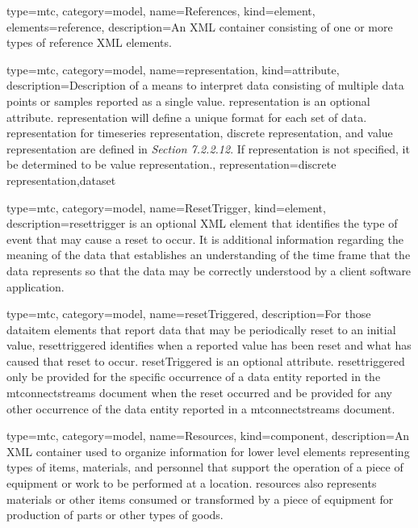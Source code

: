 {
  type=mtc,
  category=model,
  name={References},
  kind={element},
  elements={\gls{reference}},
  description={An XML container consisting of one or more types of \gls{reference} XML elements.}
}


{
  type=mtc,
  category=model,
  name={representation},
  kind={attribute},
  description={Description of a means to interpret data consisting of multiple data points or samples reported as a single value.  \newline \gls{representation} is an optional attribute.  \newline \gls{representation} will define a unique format for each set of data.  \newline \gls{representation} for \gls{timeseries representation}, \gls{discrete representation}, and \gls{value representation} are defined in  \textit{Section 7.2.2.12}.  \newline If \gls{representation} is not specified, it \MUST be determined to be \gls{value representation}.},
  representation={\gls{discrete representation},\gls{dataset}}
}

{
  type=mtc,
  category=model,
  name={ResetTrigger},
  kind={element},
  description={\gls{resettrigger} is an optional XML element that identifies the type of event that may cause a reset to occur. It is additional information regarding the meaning of the data that establishes an understanding of the time frame that the data represents so that the data may be correctly understood by a client software application.}
}


{
  type=mtc,
  category=model,
  name={resetTriggered},
  description={For those \gls{dataitem} elements that report data that may be periodically reset to an initial value, \gls{resettriggered} identifies when a reported value has been reset and what has caused that reset to occur.  \newline resetTriggered is an optional attribute.  \newline \gls{resettriggered} \MUST only be provided for the specific occurrence of a \gls{data entity} reported in the \gls{mtconnectstreams} document when the reset occurred and \MUSTNOT be provided for any other occurrence of the \gls{data entity} reported in a \gls{mtconnectstreams} document.}
}


{
  type=mtc,
  category=model,
  name={Resources},
  kind={component},
  description={An XML container used to organize information for \gls{lower level} elements representing types of items, materials, and personnel that support the operation of a piece of equipment or work to be performed at a location. \gls{resources} also represents materials or other items consumed or transformed by a piece of equipment for production of parts or other types of goods.}
}


